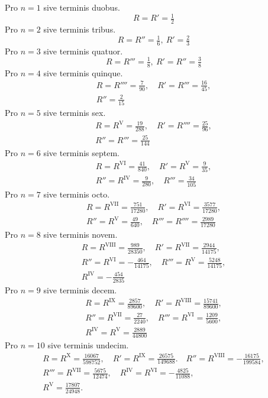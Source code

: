 Pro $n=1$ sive terminis duobus.
\[
R=R'=\tfrac12
\]
Pro $n=2$ sive terminis tribus.
\[
R=R''=\tfrac16,\ R'=\tfrac23
\]
Pro $n=3$ sive terminis quatuor.
\[
R=R'''=\tfrac18,\ R'=R''=\tfrac38
\]
Pro $n=4$ sive terminis quinque.
\[
\begin{gathered}
R=R''''=\tfrac7{90},\quad R'=R'''=\tfrac{16}{45},\\[5pt]
R''=\tfrac2{15}
\end{gathered}
\]
Pro $n=5$ sive terminis sex.
\[
\begin{gathered}
R=R^{\mathrm{V}}=\tfrac{19}{288},\quad R'=R''''=\tfrac{25}{96},\\[5pt]
R''=R'''=\tfrac{25}{144}
\end{gathered}
\]
Pro $n=6$ sive terminis septem.
\[
\begin{gathered}
R=R^{\mathrm{VI}}=\tfrac{41}{840},\quad R'=R^{\mathrm{V}}=\tfrac9{35},\\[5pt]
R''=R^{\mathrm{IV}}=\tfrac9{280},\quad R'''=\tfrac{34}{105}
\end{gathered}
\]
Pro $n=7$ sive terminis octo.
\[
\begin{gathered}
R=R^{\mathrm{VII}}=\tfrac{751}{17280},\quad R'=R^{\mathrm{VI}}=\tfrac{3577}{17280},\\[5pt]
R''=R^{\mathrm{V}}=\tfrac{49}{640},\quad R'''=R''''=\tfrac{2989}{17280}
\end{gathered}
\]
Pro $n=8$ sive terminis novem.
\[
\begin{gathered}
R=R^{\mathrm{VIII}}=\tfrac{989}{28350},\quad R'=R^{\mathrm{VII}}=\tfrac{2944}{14175},\\[5pt]
R''=R^{\mathrm{VI}}=-\tfrac{464}{14175},\quad R'''=R^{\mathrm{V}}=\tfrac{5248}{14175},\\[5pt]
R^{\mathrm{IV}}=-\tfrac{454}{2835}
\end{gathered}
\]
Pro $n=9$ sive terminis decem.
\[
\begin{gathered}
R=R^{\mathrm{IX}}=\frac{2857}{89600},\quad R'=R^{\mathrm{VIII}}=\frac{15741}{89600},\\[5pt]
R''=R^{\mathrm{VII}}=\frac{27}{2240},\quad R'''=R^{\mathrm{VI}}=\frac{1209}{5600},\\[5pt]
R^{\mathrm{IV}}=R^{\mathrm{V}}=\frac{2889}{44800}
\end{gathered}
\]
Pro $n=10$ sive terminis undecim.
\[
\begin{gathered}
R=R^{\mathrm{X}}=\frac{16067}{598752},\quad R'=R^{\mathrm{IX}}=\frac{26575}{149688}.\quad
R''=R^{\mathrm{VIII}}=-\frac{16175}{199584},\\[5pt]
R'''=R^{\mathrm{VII}}=\frac{5675}{12474},\quad R^{\mathrm{IV}}=R^{\mathrm{VI}}=-\frac{4825}{11088},\\[5pt]
R^{\mathrm{V}}=\frac{17807}{24948}.
\end{gathered}
\]

